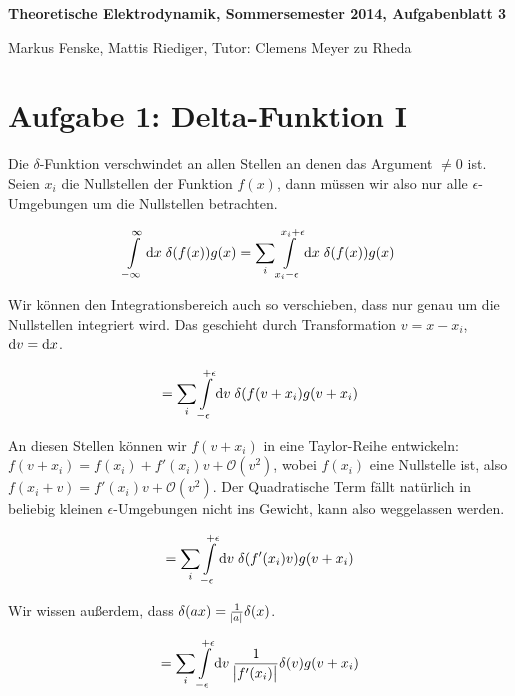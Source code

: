 \documentclass[a4paper,german,12pt,smallheadings]{scrartcl}
\begin{document}
\allowdisplaybreaks %
\begin{center}
\bfseries %
\sffamily %
\vspace{-40pt}
Theoretische Elektrodynamik, Sommersemester 2014, Aufgabenblatt 3

Markus Fenske, Mattis Riediger, Tutor: Clemens Meyer zu Rheda
\vspace{-10pt}
\end{center}

\section*{Aufgabe 1: Delta-Funktion I}

Die $\delta$-Funktion verschwindet an allen Stellen an denen das Argument $\neq
0$ ist. Seien $x_i$ die Nullstellen der Funktion $f(x)$, dann müssen wir also
nur alle $\epsilon$-Umgebungen um die Nullstellen betrachten.

\begin{equation}
  \int\limits_{-\infty}^\infty \dif x \; \delta(f(x)) g(x) = \sum_{i} \int\limits_{x_i - \epsilon}^{x_i + \epsilon} \dif x \; \delta(f(x)) g(x)
\end{equation}

Wir können den Integrationsbereich auch so verschieben, dass nur genau um die
Nullstellen integriert wird. Das geschieht durch Transformation $v = x - x_i$,
$\dif v = \dif x$.

\begin{equation}
  = \sum_{i} \int\limits_{ -\epsilon}^{+\epsilon} \dif v \; \delta(f(v + x_i) g(v + x_i)
\end{equation}

An diesen Stellen können wir $f(v + x_i)$ in eine Taylor-Reihe entwickeln: $f(v +
x_i) = f(x_i) + f'(x_i) v + \mathcal{O}(v^2)$, wobei $f(x_i)$ eine Nullstelle
ist, also $f(x_i + v) = f'(x_i) v + \mathcal{O}(v^2)$. Der Quadratische Term
fällt natürlich in beliebig kleinen $\epsilon$-Umgebungen nicht ins Gewicht,
kann also weggelassen werden.

\begin{equation}
  = \sum_{i} \int\limits_{- \epsilon}^{+ \epsilon} \dif v \; \delta(f'(x_i) v) g(v + x_i)
\end{equation}

Wir wissen außerdem, dass $\delta(ax) = \frac{1}{\envert{a}} \delta(x)$.

\begin{equation}
  = \sum_{i} \int\limits_{- \epsilon}^{+ \epsilon} \dif v \; \frac{1}{\envert{f'(x_i)}} \delta(v) g(v + x_i)
\end{equation}
\end{document}
